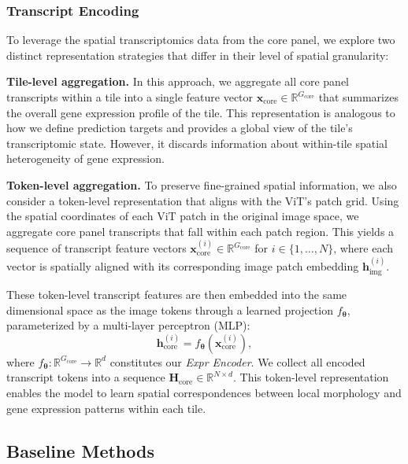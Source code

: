 \subsubsection{Transcript Encoding}
\label{sec:transcript-encoding}

To leverage the spatial transcriptomics data from the core panel, we explore two distinct representation strategies that differ in their level of spatial granularity:

\textbf{Tile-level aggregation.} In this approach, we aggregate all core panel transcripts within a tile into a single feature vector $\mathbf{x}_{\text{core}}\in\mathbb{R}^{G_{\text{core}}}$ that summarizes the overall gene expression profile of the tile. This representation is analogous to how we define prediction targets and provides a global view of the tile's transcriptomic state. However, it discards information about within-tile spatial heterogeneity of gene expression.

\textbf{Token-level aggregation.} To preserve fine-grained spatial information, we also consider a token-level representation that aligns with the ViT's patch grid. Using the spatial coordinates of each ViT patch in the original image space, we aggregate core panel transcripts that fall within each patch region. This yields a sequence of transcript feature vectors $\mathbf{x}_{\text{core}}^{(i)}\in\mathbb{R}^{G_{\text{core}}}$ for $i\in\{1,\dots,N\}$, where each vector is spatially aligned with its corresponding image patch embedding $\mathbf{h}_{\text{img}}^{(i)}$. 

These token-level transcript features are then embedded into the same dimensional space as the image tokens through a learned projection $f_{\boldsymbol{\theta}}$, parameterized by a multi-layer perceptron (MLP):
%
\begin{equation}
    \mathbf{h}_{\text{core}}^{(i)} = f_{\boldsymbol{\theta}}\!\left(\mathbf{x}_{\text{core}}^{(i)}\right),
\end{equation}
%
where $f_{\boldsymbol{\theta}} : \mathbb{R}^{G_{\text{core}}} \to \mathbb{R}^{d}$ constitutes our \emph{Expr Encoder}. We collect all encoded transcript tokens into a sequence $\mathbf{H}_{\text{core}}\in\mathbb{R}^{N\times d}$. This token-level representation enables the model to learn spatial correspondences between local morphology and gene expression patterns within each tile.

\subsection*{Baseline Methods}
\label{sec:baseline-methods}

